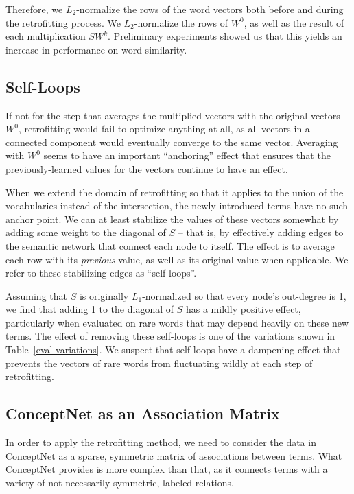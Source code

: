 \documentclass[letterpaper]{article}
\begin{document}
Therefore, we $L_2$-normalize
the rows of the word vectors both before and during the retrofitting process.
We $L_2$-normalize the rows of $W^0$, as well as the result of each
multiplication $S W^k$. Preliminary experiments showed us that this yields
an increase in performance on word similarity.

\subsection{Self-Loops}
If not for the step that averages the multiplied vectors with the original
vectors $W^0$, retrofitting would fail to optimize anything at all, as all
vectors in a connected component would eventually converge to the same vector.
Averaging with $W^0$ seems to have an important ``anchoring'' effect that
ensures that the previously-learned values for the vectors continue to have
an effect.

When we extend the domain of retrofitting so that it applies to the union of
the vocabularies instead of the intersection, the newly-introduced terms have
no such anchor point. We can at least stabilize the values of these vectors
somewhat by adding some weight to the diagonal of $S$ -- that is, by
effectively adding edges to the semantic network that connect each node to
itself. The effect is to average each row with its {\em previous} value, as
well as its original value when applicable. We refer to these stabilizing edges
as ``self loops''.

Assuming that $S$ is originally $L_1$-normalized so that every node's
out-degree is 1, we find that adding 1 to the diagonal of $S$ has a mildly
positive effect, particularly when evaluated on rare words that may depend
heavily on these new terms. The effect of removing these self-loops is one of
the variations shown in Table~\ref{eval-variations}.  We suspect that
self-loops have a dampening effect that prevents the vectors of rare words from
fluctuating wildly at each step of retrofitting.

\subsection{ConceptNet as an Association Matrix}

In order to apply the retrofitting method, we need to consider the data in
ConceptNet as a sparse, symmetric matrix of associations between terms. What
ConceptNet provides is more complex than that, as it connects terms with a
variety of not-necessarily-symmetric, labeled relations.
\end{document}
